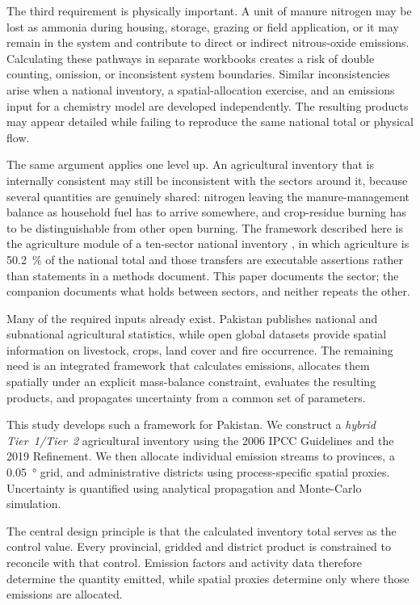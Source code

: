 The third requirement is physically important. A unit of manure nitrogen may be lost as
ammonia during housing, storage, grazing or field application, or it may remain in the
system and contribute to direct or indirect nitrous-oxide emissions. Calculating these
pathways in separate workbooks creates a risk of double counting, omission, or inconsistent
system boundaries. Similar inconsistencies arise when a national inventory, a
spatial-allocation exercise, and an emissions input for a chemistry model are developed
independently. The resulting products may appear detailed while failing to reproduce the
same national total or physical flow.

The same argument applies one level up. An agricultural inventory that is internally
consistent may still be inconsistent with the sectors around it, because several quantities
are genuinely shared: nitrogen leaving the manure-management balance as household fuel has to
arrive somewhere, and crop-residue burning has to be distinguishable from other open burning.
The framework described here is the agriculture module of a ten-sector national inventory
\citep{ahmad2026national}, in which agriculture is \SI{50.2}{\percent} of the national total
and those transfers are executable assertions rather than statements in a methods document.
This paper documents the sector; the companion documents what holds between sectors, and
neither repeats the other.

Many of the required inputs already exist. Pakistan publishes national and subnational
agricultural statistics, while open global datasets provide spatial information on
livestock, crops, land cover and fire occurrence. The remaining need is an integrated
framework that calculates emissions, allocates them spatially under an explicit
mass-balance constraint, evaluates the resulting products, and propagates uncertainty from
a common set of parameters.

This study develops such a framework for Pakistan. We construct a \emph{hybrid
Tier~1/Tier~2} agricultural inventory using the 2006 IPCC Guidelines and the 2019
Refinement. We then allocate individual emission streams to provinces, a
\SI{0.05}{\degree} grid, and administrative districts using process-specific spatial
proxies. Uncertainty is quantified using analytical propagation and Monte-Carlo simulation.

The central design principle is that the calculated inventory total serves as the control
value. Every provincial, gridded and district product is constrained to reconcile with that
control. Emission factors and activity data therefore determine the quantity emitted, while
spatial proxies determine only where those emissions are allocated.

